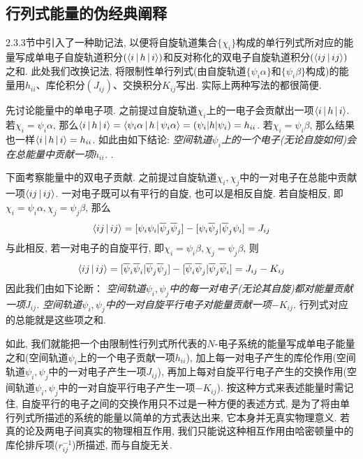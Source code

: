 \subsection{行列式能量的伪经典阐释}
\label{sec2.3.7}
2.3.3节中引入了一种助记法, 以便将自旋轨道集合$\{\chi_i\}$构成的单行列式所对应的能量写成单电子自旋轨道积分$(\Braket{i|h|i})$和反对称化的双电子自旋轨道积分$(\Braket{ij|ij})$之和. 此处我们改换记法, 将限制性单行列式(由自旋轨道$\{ \psi_i\alpha \}$和$\{ \psi_i\beta \}$构成)的能量用$h_{ii}$、库伦积分$(J_{ij})$、交换积分$K_{ij}$写出. 实际上两种写法的都很简便.

先讨论能量中的单电子项. 之前提过自旋轨道$\chi_i$上的一电子会贡献出一项$\Braket{i|h|i}$. 若$\chi_i=\psi_i\alpha$,  那么$\Braket{i|h|i} = \Braket{\psi_i\alpha|h|\psi_i\alpha} = (\psi_i|h|\psi_i) = h_{ii}$. 若$\chi_i = \psi_i\beta$, 那么结果也一样$\Braket{i|h|i} = h_{ii}$. 如此由如下结论: \emph{
空间轨道$\psi_i$上的一个电子(无论自旋如何)会在总能量中贡献一项$h_{ii}$.
}.

下面考察能量中的双电子贡献. 之前提过自旋轨道$\chi_i,\chi_j$中的一对电子在总能中贡献一项$\Braket{ij|ij}$. 一对电子既可以有平行的自旋, 也可以是相反自旋. 若自旋相反, 即$\chi_i=\psi_i\alpha, \chi_j=\psi_j\beta$, 那么
\begin{align}
\Braket{ij|ij} = [ \psi_i\psi_i | \overline{\psi}_j\overline{\psi}_j ] - [ \psi_i\overline{\psi}_j| \overline{\psi}_j\psi_i ] = J_{ij}
\end{align}
与此相反, 若一对电子的自旋平行, 即$\chi_i=\psi_i\beta, \chi_j=\psi_j\beta$, 则
\begin{align}
\Braket{ij|ij} = [ \overline{\psi}_i\overline{\psi}_i | \overline{\psi}_j\overline{\psi}_j ] - [ \overline{\psi}_i\overline{\psi}_j| \overline{\psi}_j\overline{\psi}_i ] = J_{ij} -K_{ij}
\end{align}
因此我们由如下论断：\emph{
空间轨道$\psi_i,\psi_j$中的每一对电子(无论其自旋)都对能量贡献一项$J_{ij}$. 空间轨道$\psi_i,\psi_j$中的一对自旋平行电子对能量贡献一项$-K_{ij}$.
}行列式对应的总能就是这些项之和.

如此, 我们就能把一个由限制性行列式所代表的$N$-电子系统的能量写成单电子能量之和(空间轨道$\psi_i$上的一个电子贡献一项$h_{ii}$), 加上每一对电子产生的库伦作用(空间轨道$\psi_i,\psi_j$中的一对电子产生一项$J_{ij}$), 再加上每对自旋平行电子产生的交换作用(空间轨道$\psi_i,\psi_j$中的一对自旋平行电子产生一项$-K_{ij}$). 按这种方式来表述能量时需记住, 自旋平行的电子之间的交换作用只不过是一种方便的表述方式, 是为了将由单行列式所描述的系统的能量以简单的方式表达出来, 它本身并无真实物理意义. 若真的论及两电子间真实的物理相互作用, 我们只能说这种相互作用由哈密顿量中的库伦排斥项($r_{ij}^{-1}$)所描述, 而与自旋无关. 

